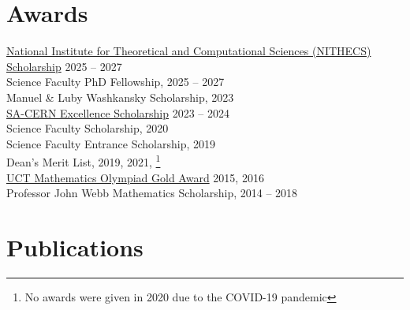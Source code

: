 \documentclass[11pt,letter,sans]{moderncv}
\begin{document}
\section{Awards}
    \href{https://nithecs.ac.za/}{National Institute for Theoretical and Computational Sciences (NITHECS) Scholarship}  \hfill 2025 -- 2027    \\[0.5mm]
 Science Faculty PhD Fellowship, {\scriptsize \color{gray}{University of Cape Town}}  \hfill 2025 -- 2027    \\[0.5mm]
 Manuel \& Luby Washkansky Scholarship, {\scriptsize \color{gray}{University of Cape Town}}  \hfill 2023    \\[0.5mm]
    \href{https://tlabs.ac.za/sa-cern/}{SA-CERN Excellence Scholarship}  \hfill 2023 -- 2024    \\[0.5mm]
 Science Faculty Scholarship, {\scriptsize \color{gray}{University of Cape Town}}  \hfill 2020    \\[0.5mm]
 Science Faculty Entrance Scholarship, {\scriptsize \color{gray}{University of Cape Town}}  \hfill 2019    \\[0.5mm]
 Dean’s Merit List, {\scriptsize \color{gray}{University of Cape Town}}  \hfill 2019, 2021, \footnote{No awards were given in 2020 due to the COVID-19 pandemic}    \\[0.5mm]
    \href{https://www.uctmathscompetition.org.za/home}{UCT Mathematics Olympiad Gold Award}  \hfill 2015, 2016    \\[0.5mm]
 Professor John Webb Mathematics Scholarship, {\scriptsize \color{gray}{Wynberg Boys' High School}}  \hfill 2014 -- 2018    \\[0.5mm]


\section{Publications}

\end{document}
